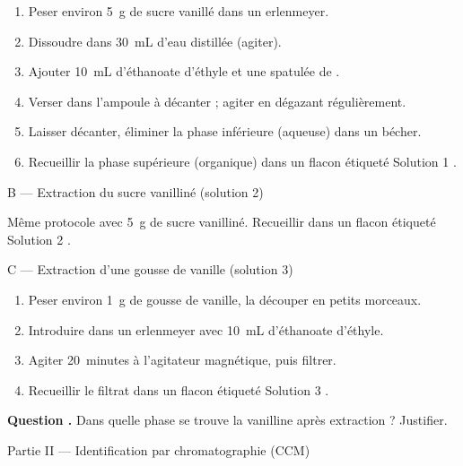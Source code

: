 \documentclass[11pt,a4paper]{article}
\newcommand{\sectitle}[1]{%
  \vspace{6pt}
  \noindent\colorbox{exoheader}{\parbox{\dimexpr\linewidth-2\fboxsep}%
    {\color{white}\bfseries\large\strut\quad #1}}
  \vspace{4pt}
}
\newcommand{\subsectitle}[1]{%
  \vspace{4pt}
  \noindent\colorbox{exolight}{\parbox{\dimexpr\linewidth-2\fboxsep}%
    {\color{exoheader}\bfseries\strut\quad #1}}
  \vspace{2pt}
}
\newcounter{question}
\newcommand{\question}{%
  \stepcounter{question}%
  \noindent\textcolor{exoheader}{\textbf{Question \thequestion.}}\quad
}
\begin{document}
\begin{enumerate}[leftmargin=1.5cm, label=\textcolor{exoheader}{\textbf{\arabic*.}}]
  \item Peser environ 5~g de sucre vanillé dans un erlenmeyer.
  \item Dissoudre dans 30~mL d'eau distillée (agiter).
  \item Ajouter 10~mL d'éthanoate d'éthyle et une spatulée de .
  \item Verser dans l'ampoule à décanter ; agiter en dégazant régulièrement.
  \item Laisser décanter, éliminer la phase inférieure (aqueuse) dans un bécher.
  \item Recueillir la phase supérieure (organique) dans un flacon étiqueté \og Solution 1 \fg{}.
\end{enumerate}

\vspace{4pt}
\subsectitle{B --- Extraction du sucre vanilliné (solution 2)}

Même protocole avec 5~g de sucre vanilliné. Recueillir dans un flacon étiqueté \og Solution 2 \fg{}.

\vspace{4pt}
\subsectitle{C --- Extraction d'une gousse de vanille (solution 3)}

\begin{enumerate}[leftmargin=1.5cm, label=\textcolor{exoheader}{\textbf{\arabic*.}}]
  \item Peser environ 1~g de gousse de vanille, la découper en petits morceaux.
  \item Introduire dans un erlenmeyer avec 10~mL d'éthanoate d'éthyle.
  \item Agiter 20~minutes à l'agitateur magnétique, puis filtrer.
  \item Recueillir le filtrat dans un flacon étiqueté \og Solution 3 \fg{}.
\end{enumerate}

\vspace{4pt}
\question Dans quelle phase se trouve la vanilline après extraction ? Justifier. \dotfill

\vspace{0.3cm}\noindent\dotfill

\newpage
\sectitle{Partie II --- Identification par chromatographie (CCM)}
\end{document}
